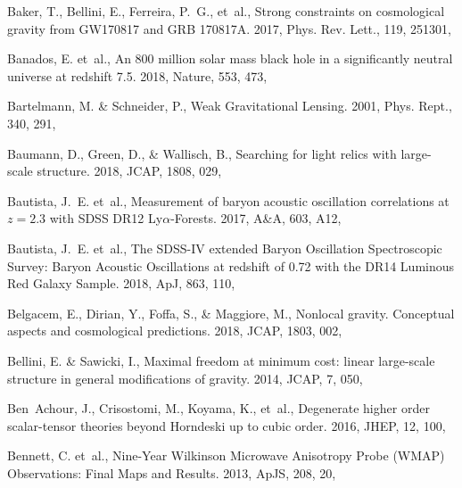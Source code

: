 \documentclass[longauth,traditabstract]{aa}
\def\aap{{A\&A}}
\def\apj{{ApJ}}
\def\apjs{{ApJS}}
\def\jcap{{JCAP}}
\begin{document}
\begin{thebibliography}{379}
Baker, T., Bellini, E., Ferreira, P.~G., {et~al.}, {Strong constraints on
  cosmological gravity from GW170817 and GRB 170817A}. 2017, Phys. Rev. Lett.,
  119, 251301, 

Banados, E. {et~al.}, {An 800 million solar mass black hole in a significantly
  neutral universe at redshift 7.5}. 2018, Nature, 553, 473,

Bartelmann, M. \& Schneider, P., Weak Gravitational Lensing. 2001, Phys. Rept.,
  340, 291, 

Baumann, D., Green, D., \& Wallisch, B., {Searching for light relics with
  large-scale structure}. 2018, JCAP, 1808, 029, 

Bautista, J.~E. {et~al.}, {Measurement of baryon acoustic oscillation
  correlations at $z=2.3$ with SDSS DR12 Ly$\alpha$-Forests}. 2017, \aap, 603,
  A12, 

Bautista, J.~E. {et~al.}, {The SDSS-IV extended Baryon Oscillation
  Spectroscopic Survey: Baryon Acoustic Oscillations at redshift of 0.72 with
  the DR14 Luminous Red Galaxy Sample}. 2018, \apj, 863, 110,

Belgacem, E., Dirian, Y., Foffa, S., \& Maggiore, M., {Nonlocal gravity.
  Conceptual aspects and cosmological predictions}. 2018, JCAP, 1803, 002,

{Bellini}, E. \& {Sawicki}, I., {Maximal freedom at minimum cost: linear
  large-scale structure in general modifications of gravity}. 2014, \jcap, 7,
  050, 

Ben~Achour, J., Crisostomi, M., Koyama, K., {et~al.}, {Degenerate higher order
  scalar-tensor theories beyond Horndeski up to cubic order}. 2016, JHEP, 12,
  100, 

Bennett, C. {et~al.}, {Nine-Year Wilkinson Microwave Anisotropy Probe (WMAP)
  Observations: Final Maps and Results}. 2013, \apjs, 208, 20,


\end{thebibliography}
\end{document}
